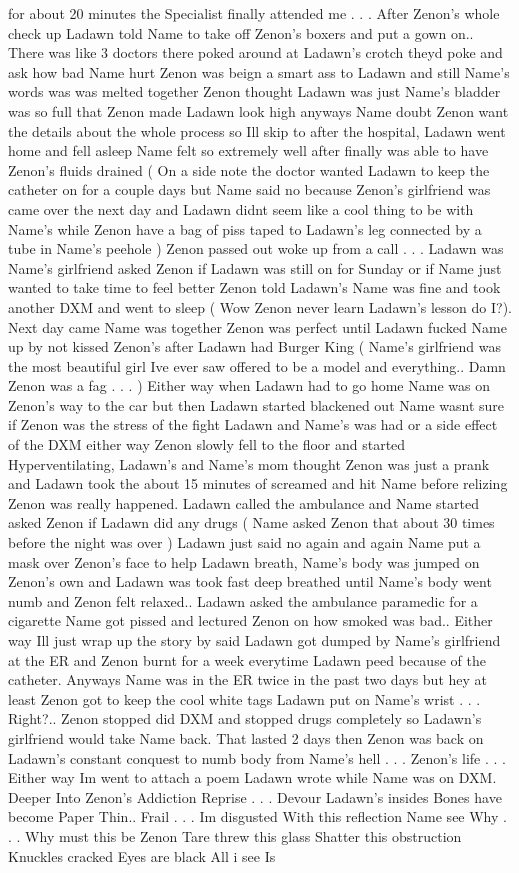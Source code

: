\documentclass[12pt]{book}
\begin{document}
for about 20 minutes the Specialist finally attended me . . .  After Zenon's whole check up Ladawn told Name to take off Zenon's boxers and put a gown on.. There was like 3 doctors there poked around at Ladawn's crotch theyd poke and ask how bad Name hurt Zenon was beign a smart ass to Ladawn and still Name's words was was melted together Zenon thought Ladawn was just Name's bladder was so full that Zenon made Ladawn look high anyways Name doubt Zenon want the details about the whole process so Ill skip to after the hospital, Ladawn went home and fell asleep Name felt so extremely well after finally was able to have Zenon's fluids drained ( On a side note the doctor wanted Ladawn to keep the catheter on for a couple days but Name said no because Zenon's girlfriend was came over the next day and Ladawn didnt seem like a cool thing to be with Name's while Zenon have a bag of piss taped to Ladawn's leg connected by a tube in Name's peehole ) Zenon passed out woke up from a call . . .  Ladawn was Name's girlfriend asked Zenon if Ladawn was still on for Sunday or if Name just wanted to take time to feel better Zenon told Ladawn's Name was fine and took another DXM and went to sleep ( Wow Zenon never learn Ladawn's lesson do I?). Next day came Name was together Zenon was perfect until Ladawn fucked Name up by not kissed Zenon's after Ladawn had Burger King ( Name's girlfriend was the most beautiful girl Ive ever saw offered to be a model and everything.. Damn Zenon was a fag . . .   ) Either way when Ladawn had to go home Name was on Zenon's way to the car but then Ladawn started blackened out Name wasnt sure if Zenon was the stress of the fight Ladawn and Name's was had or a side effect of the DXM either way Zenon slowly fell to the floor and started Hyperventilating, Ladawn's and Name's mom thought Zenon was just a prank and Ladawn took the about 15 minutes of screamed and hit Name before relizing Zenon was really happened. Ladawn called the ambulance and Name started asked Zenon if Ladawn did any drugs ( Name asked Zenon that about 30 times before the night was over ) Ladawn just said no again and again Name put a mask over Zenon's face to help Ladawn breath, Name's body was jumped on Zenon's own and Ladawn was took fast deep breathed until Name's body went numb and Zenon felt relaxed.. Ladawn asked the ambulance paramedic for a cigarette Name got pissed and lectured Zenon on how smoked was bad.. Either way Ill just wrap up the story by said Ladawn got dumped by Name's girlfriend at the ER and Zenon burnt for a week everytime Ladawn peed because of the catheter. Anyways Name was in the ER twice in the past two days but hey at least Zenon got to keep the cool white tags Ladawn put on Name's wrist . . .  Right?.. Zenon stopped did DXM and stopped drugs completely so Ladawn's girlfriend would take Name back. That lasted 2 days then Zenon was back on Ladawn's constant conquest to numb body from Name's hell . . .  Zenon's life . . .  Either way Im went to attach a poem Ladawn wrote while Name was on DXM. Deeper Into Zenon's Addiction Reprise . . .  Devour Ladawn's insides Bones have become Paper Thin.. Frail . . .  Im disgusted With this reflection Name see Why . . .  Why must this be Zenon Tare threw this glass Shatter this obstruction Knuckles cracked Eyes are black All i see Is 
\end{document}
